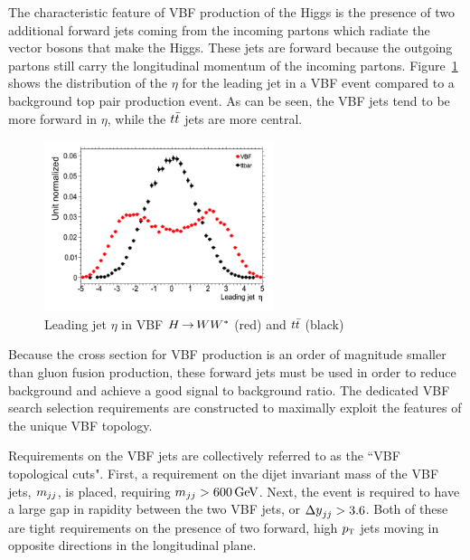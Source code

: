 The characteristic feature of VBF production of the Higgs is the presence of two additional forward jets coming from the incoming partons which radiate the vector bosons that make the Higgs. These jets are forward because the outgoing partons still carry the longitudinal momentum of the incoming partons. Figure~\ref{fig:VBF_LeadJetEta} shows the distribution of the $\eta$ for the leading jet in a VBF event compared to a background top pair production event. As can be seen, the VBF jets tend to be more forward in $\eta$, while the $t\bar{t}$ jets are more central. 
%
\begin{figure}[h!]
  \vspace{20pt}
  \centering
  \hspace*{-32pt}
  \includegraphics[width=0.6\textwidth]{figures/VBF_LeadJetEta}
  \caption{Leading jet $\eta$ in VBF $H{\,{\rightarrow}\,}WW^\ast$ (red) and $t\bar{t}$ (black)}
  \label{fig:VBF_LeadJetEta}
\end{figure}
%
Because the cross section for VBF production is an order of magnitude smaller than gluon fusion production, these forward jets must be used in order to reduce background and achieve a good signal to background ratio. The dedicated VBF search selection requirements are constructed to maximally exploit the features of the unique VBF topology.

Requirements on the VBF jets are collectively referred to as the ``VBF topological cuts". First, a requirement on the dijet invariant mass of the VBF jets, $m_{jj}$, is placed, requiring $\mjj > 600 \GeV$. Next, the event is required to have a large gap in rapidity between the two VBF jets, or $\dyjj > 3.6$. Both of these are tight requirements on the presence of two forward, high $p_{\textrm{\footnotesize\sc t}}$ jets moving in opposite directions in the longitudinal plane. 

